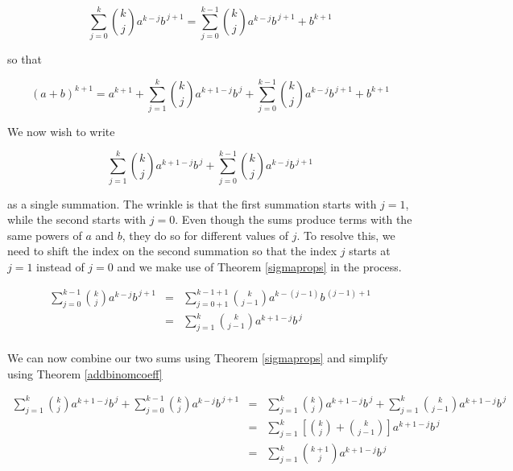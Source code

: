 \[ \displaystyle{\sum_{j=0}^{k} \binom{k}{j} a^{k-j} b^{\, j+1} = \sum_{j=0}^{k-1} \binom{k}{j} a^{k-j} b^{\, j+1} + b^{k+1}}\]

so that

\[ (a+b)^{k+1} = \displaystyle{a^{k+1} + \sum_{j=1}^{k} \binom{k}{j} a^{k+1-j} b^{\, j} + \sum_{j=0}^{k-1} \binom{k}{j} a^{k-j} b^{\, j+1}  + b^{k+1}}\]

We now wish to write

\[\displaystyle{\sum_{j=1}^{k} \binom{k}{j} a^{k+1-j} b^{\, j} + \sum_{j=0}^{k-1} \binom{k}{j} a^{k-j} b^{\, j+1}}\]

as a single summation.  The wrinkle is that the first summation starts with $j=1$, while the second starts with $j=0$. Even though the sums produce terms with the same powers of $a$ and $b$, they do so for different values of $j$.  To resolve this, we need to shift the index on the second summation so that the index $j$ starts at $j=1$ instead of $j=0$ and we make use of Theorem \ref{sigmaprops} in the process.

\[ \begin{array}{rcl}

\displaystyle{ \sum_{j=0}^{k-1} \binom{k}{j} a^{k-j} b^{\, j+1}} & = & \displaystyle{\sum_{j=0+1}^{k-1+1} \binom{k}{j-1} a^{k-(j-1)} b^{\, (j-1)+1}} \\[15pt]
                                                              & = & \displaystyle{\sum_{j=1}^{k} \binom{k}{j-1} a^{k+1-j} b^{\, j}} \\ [15pt] 
\end{array} \]

We can now combine our two sums using Theorem \ref{sigmaprops} and simplify using Theorem \ref{addbinomcoeff}

\[ \begin{array}{rcl}

\displaystyle{\sum_{j=1}^{k} \binom{k}{j} a^{k+1-j} b^{\, j} + \sum_{j=0}^{k-1} \binom{k}{j} a^{k-j} b^{\, j+1}} & = & \displaystyle{\sum_{j=1}^{k} \binom{k}{j} a^{k+1-j} b^{\, j} + \sum_{j=1}^{k} \binom{k}{j-1} a^{k+1-j} b^{\, j}} \\ [15pt] 

& = & \displaystyle{\sum_{j=1}^{k} \left[ \binom{k}{j} + \binom{k}{j-1} \right] a^{k+1-j} b^{\, j} } \\ [15pt]

& = & \displaystyle{\sum_{j=1}^{k} \binom{k+1}{j} a^{k+1-j} b^{\, j} } \\

\end{array} \]

